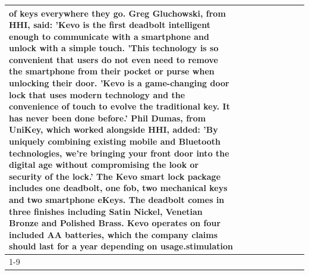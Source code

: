\begin{table}[H]
\begin{tabular}{lllrlllll}
of keys everywhere they go. Greg Gluchowski, from HHI, said: 'Kevo is the first deadbolt intelligent enough to communicate with a smartphone and unlock with a simple touch. 'This technology is so convenient that users do not even need to remove the smartphone from their pocket or purse when unlocking their door. 'Kevo is a game-changing door lock that uses modern technology and the convenience of touch to evolve the traditional key. It has never been done before.' Phil Dumas, from UniKey, which worked alongside HHI, added: 'By uniquely combining existing mobile and Bluetooth technologies, we’re bringing your front door into the digital age without compromising the look or security of the lock.' The Kevo smart lock package includes one deadbolt, one fob, two mechanical keys and two smartphone eKeys. The deadbolt comes in three finishes including Satin Nickel, Venetian Bronze and Polished Brass. Kevo operates on four included AA batteries, which the company claims should last for a year depending on usage.stimulation \\
\cline{1-9}

\end{tabular}
\end{table}
